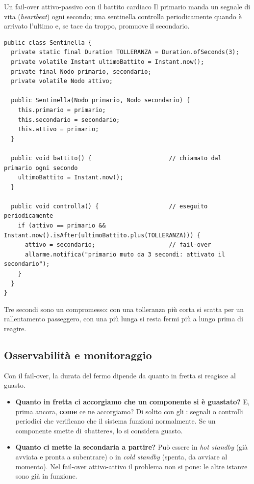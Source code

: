 \begin{esempio}{Un fail-over attivo-passivo con il battito cardiaco}
Il primario manda un segnale di vita (\textit{heartbeat}) ogni secondo; una sentinella controlla periodicamente quando è
arrivato l'ultimo e, se tace da troppo, promuove il secondario.
\begin{lstlisting}[style=java, name=Sentinella.java]
public class Sentinella {
  private static final Duration TOLLERANZA = Duration.ofSeconds(3);
  private volatile Instant ultimoBattito = Instant.now();
  private final Nodo primario, secondario;
  private volatile Nodo attivo;

  public Sentinella(Nodo primario, Nodo secondario) {
    this.primario = primario;
    this.secondario = secondario;
    this.attivo = primario;
  }

  public void battito() {                      // chiamato dal primario ogni secondo
    ultimoBattito = Instant.now();
  }

  public void controlla() {                    // eseguito periodicamente
    if (attivo == primario && Instant.now().isAfter(ultimoBattito.plus(TOLLERANZA))) {
      attivo = secondario;                     // fail-over
      allarme.notifica("primario muto da 3 secondi: attivato il secondario");
    }
  }
}
\end{lstlisting}
Tre secondi sono un compromesso: con una tolleranza più corta si scatta per un rallentamento passeggero, con una più lunga
si resta fermi più a lungo prima di reagire.
\end{esempio}

\subsection{Osservabilità e monitoraggio}

Con il fail-over, la durata del fermo dipende da quanto in fretta si reagisce al guasto.
\begin{itemize}
  \item \textbf{Quanto in fretta ci accorgiamo che un componente si è guastato?} E, prima ancora, \textbf{come} ce ne
        accorgiamo? Di solito con gli : segnali o controlli periodici che verificano che il sistema funzioni
        normalmente. Se un componente smette di «battere», lo si considera guasto.
  \item \textbf{Quanto ci mette la secondaria a partire?} Può essere in \textit{hot standby} (già avviata e pronta a
        subentrare) o in \textit{cold standby} (spenta, da avviare al momento). Nel fail-over attivo-attivo il problema non
        si pone: le altre istanze sono già in funzione.
\end{itemize}

